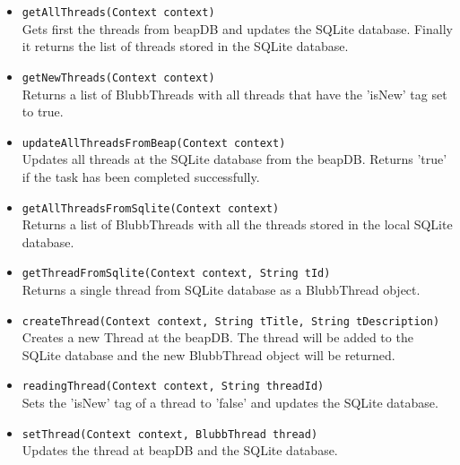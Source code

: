 \documentclass[12pt,a4paper,oneside]{report}
\newcommand{\beapDB}{beapDB}
\newcommand{\code}[1]{\lstinline{#1}}
\begin{document}
\begin{itemize}
\item{\code{getAllThreads(Context context)}}\\
Gets first the threads from \beapDB{} and updates the SQLite database. Finally it returns the list of threads stored in the SQLite database.

\item{\code{getNewThreads(Context context)}}\\
Returns a list of BlubbThreads with all threads that have the 'isNew' tag set to true.
 
\item{\code{updateAllThreadsFromBeap(Context context)}}\\
Updates all threads at the SQLite database from the \beapDB{}. Returns 'true' if the task has been completed successfully.

\item{\code{getAllThreadsFromSqlite(Context context)}}\\
Returns a list of BlubbThreads with all the threads stored in the local SQLite database.

\item{\code{getThreadFromSqlite(Context context, String tId)}}\\
Returns a single thread from SQLite database as a BlubbThread object.

\item{\code{createThread(Context context, String tTitle, String tDescription)}}\\
Creates a new Thread at the \beapDB{}. The thread will be added to the SQLite database and the new BlubbThread object will be returned.

\item{\code{readingThread(Context context, String threadId)}}\\
Sets the 'isNew' tag of a thread to 'false' and updates the SQLite database.

\item{\code{setThread(Context context, BlubbThread thread)}}\\
Updates the thread at \beapDB{} and the SQLite database.

\end{itemize}
\end{document}
